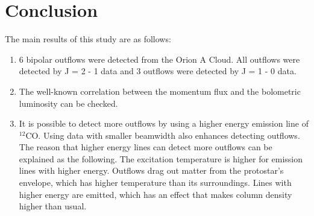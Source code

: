 \newpage

\section{Conclusion}
The main results of this study are as follows:
\begin{enumerate}
	\item 6 bipolar outflows were detected from the Orion A Cloud. All outflows were detected by J = 2 - 1 data and 3 outflows were detected by J = 1 - 0 data.
	\item The well-known correlation between the momentum flux and the bolometric luminosity can be checked.
	\item It is possible to detect more outflows by using a higher energy emission line of $^{12}$CO. Using data with smaller beamwidth also enhances detecting outflows. The reason that higher energy lines can detect more outflows can be explained as the following. The excitation temperature is higher for emission lines with higher energy. Outflows drag out matter from the protostar's envelope, which has higher temperature than its surroundings. Lines with higher energy are emitted, which has an effect that makes column density higher than usual.	
\end{enumerate}